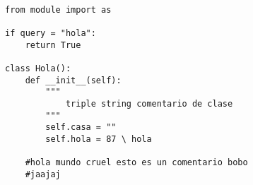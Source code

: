 \documentclass[10pt, a4paper]{article}
\author{Ricardo D. Quiroga - L2Radamanthys}
\begin{document}
\begin{lstlisting}

from module import as

if query = "hola":
	return True

class Hola():
	def __init__(self):
		"""
			triple string comentario de clase
		"""
		self.casa = ""
		self.hola =	87 \ hola 
	
	#hola mundo cruel esto es un comentario bobo
	#jaajaj
\end{lstlisting}
\end{document}
